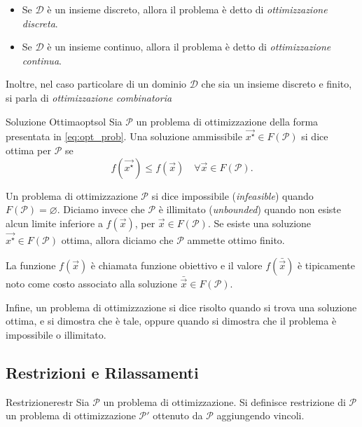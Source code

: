 \begin{itemize}
    \item Se \( \mathcal{D} \) è un insieme discreto, allora il problema è detto di \textit{ottimizzazione discreta}.
    \item Se \( \mathcal{D} \) è un insieme continuo, allora il problema è detto di \textit{ottimizzazione continua}.
\end{itemize}
Inoltre, nel caso particolare di un dominio
\(
    \mathcal{D}
\)
che sia un insieme discreto e finito, si parla di \textit{ottimizzazione combinatoria}
\begin{defbox}{Soluzione Ottima}{optsol}
    Sia \( \mathcal{P} \) un problema di ottimizzazione della forma presentata in \eqref{eq:opt_prob}. Una soluzione
    ammissibile \( \vec{x^{\star}} \in F(\mathcal{P}) \) si dice ottima per \( \mathcal{P} \) se
    \[
        f(\vec{x^{\star}}) \leq f(\vec{x}) \quad \forall \vec{x} \in F(\mathcal{P}).
    \]
\end{defbox}
Un problema di ottimizzazione \( \mathcal{P} \) si dice impossibile (\textit{infeasible}) quando
\(
    F(\mathcal{P}) = \varnothing.
\)
Diciamo invece che
\(
    \mathcal{P}
\)
è illimitato (\textit{unbounded}) quando non esiste alcun limite inferiore a \( f(\vec{x}) \), per \( \vec{x} \in
F(\mathcal{P}) \). Se esiste una soluzione \( \vec{x^{\star}} \in F(\mathcal{P}) \) ottima, allora
diciamo che \( \mathcal{P} \) ammette ottimo finito.

La funzione \( f(\vec{x}) \) è chiamata funzione obiettivo e il valore \( f(\bar{\vec{x}}) \) è tipicamente noto come
costo associato alla soluzione \( \bar{\vec{x}} \in F(\mathcal{P}) \).

Infine, un problema di ottimizzazione si dice risolto quando si trova una soluzione ottima, e si dimostra che è tale,
oppure quando si dimostra che il problema è impossibile o illimitato.

\subsection{Restrizioni e Rilassamenti}

\begin{defbox}{Restrizione}{restr}
    Sia \( \mathcal{P} \) un problema di ottimizzazione. Si definisce restrizione di \( \mathcal{P} \) un problema di
    ottimizzazione \( \mathcal{P}' \) ottenuto da \( \mathcal{P} \) aggiungendo vincoli.
\end{defbox}

